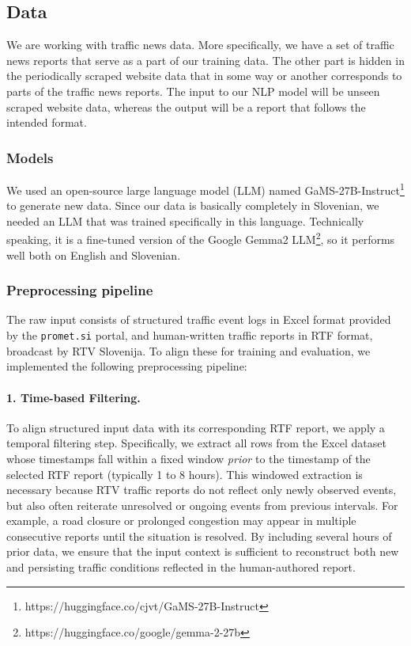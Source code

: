 \subsection*{Data}
We are working with traffic news data.
More specifically, we have a set of traffic news reports that serve as a part of our training data.
The other part is hidden in the periodically scraped website data that in some way or another corresponds to parts of the traffic news reports.
The input to our NLP model will be unseen scraped website data, whereas the output will be a report that follows the intended format.


\subsubsection*{Models}
We used an open-source large language model (LLM) named GaMS-27B-Instruct\footnote{https://huggingface.co/cjvt/GaMS-27B-Instruct} to generate new data.
Since our data is basically completely in Slovenian, we needed an LLM that was trained specifically in this language.
Technically speaking, it is a fine-tuned version of the Google Gemma2 LLM\footnote{https://huggingface.co/google/gemma-2-27b}, so it performs well both on English and Slovenian.

\subsubsection*{Preprocessing pipeline}

The raw input consists of structured traffic event logs in Excel format provided by the \texttt{promet.si} portal, and human-written traffic reports in RTF format, broadcast by RTV Slovenija. To align these for training and evaluation, we implemented the following preprocessing pipeline:

\paragraph{1. Time-based Filtering.}
To align structured input data with its corresponding RTF report, we apply a temporal filtering step. Specifically, we extract all rows from the Excel dataset whose timestamps fall within a fixed window \emph{prior} to the timestamp of the selected RTF report (typically 1 to 8 hours). This windowed extraction is necessary because RTV traffic reports do not reflect only newly observed events, but also often reiterate unresolved or ongoing events from previous intervals. For example, a road closure or prolonged congestion may appear in multiple consecutive reports until the situation is resolved. By including several hours of prior data, we ensure that the input context is sufficient to reconstruct both new and persisting traffic conditions reflected in the human-authored report.


